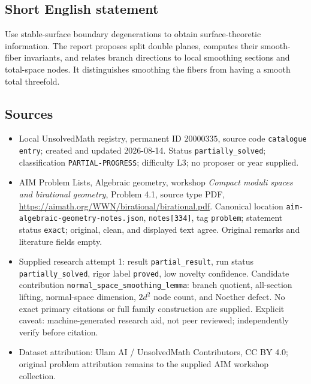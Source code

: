\documentclass[11pt]{article}
\begin{document}
\subsection{Short English statement}
Use stable-surface boundary degenerations to obtain surface-theoretic information. The report proposes split double planes, computes their smooth-fiber invariants, and relates branch directions to local smoothing sections and total-space nodes. It distinguishes smoothing the fibers from having a smooth total threefold.
\subsection{Sources}
\begin{itemize}
\item Local UnsolvedMath registry, permanent ID $20000335$, source code \texttt{catalogue entry}; created and updated 2026-08-14. Status \texttt{partially\_solved}; classification \texttt{PARTIAL-PROGRESS}; difficulty L3; no proposer or year supplied.
\item AIM Problem Lists, Algebraic geometry, workshop \emph{Compact moduli spaces and birational geometry}, Problem 4.1, source type PDF, \url{https://aimath.org/WWN/birational/birational.pdf}. Canonical location \texttt{aim-algebraic-geometry-notes.json}, \texttt{notes[334]}, tag \texttt{problem}; statement status \texttt{exact}; original, clean, and displayed text agree. Original remarks and literature fields empty.
\item Supplied research attempt 1: result \texttt{partial\_result}, run status \texttt{partially\_solved}, rigor label \texttt{proved}, low novelty confidence. Candidate contribution \texttt{normal\_space\_smoothing\_lemma}: branch quotient, all-section lifting, normal-space dimension, $2d^2$ node count, and Noether defect. No exact primary citations or full family construction are supplied. Explicit caveat: machine-generated research aid, not peer reviewed; independently verify before citation.
\item Dataset attribution: Ulam AI / UnsolvedMath Contributors, CC BY 4.0; original problem attribution remains to the supplied AIM workshop collection.
\end{itemize}
\end{document}
